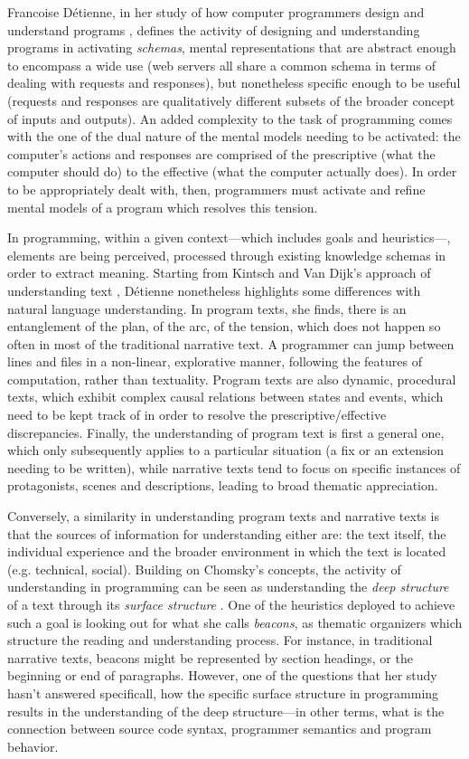 Francoise Détienne, in her study of how computer programmers design and understand programs \citep{detienne_software_2012}, defines the activity of designing and understanding programs in activating \emph{schemas}, mental representations that are abstract enough to encompass a wide use (web servers all share a common schema in terms of dealing with requests and responses), but nonetheless specific enough to be useful (requests and responses are qualitatively different subsets of the broader concept of inputs and outputs). An added complexity to the task of programming comes with the one of the dual nature of the mental models needing to be activated: the computer's actions and responses are comprised of the prescriptive (what the computer should do) to the effective (what the computer actually does). In order to be appropriately dealt with, then, programmers must activate and refine mental models of a program which resolves this tension.

In programming, within a given context—which includes goals and heuristics—, elements are being perceived, processed through existing knowledge schemas in order to extract meaning. Starting from Kintsch and Van Dijk's approach of understanding text \citep{kintsch_model_1978}, Détienne nonetheless highlights some differences with natural language understanding. In program texts, she finds, there is an entanglement of the plan, of the arc, of the tension, which does not happen so often in most of the traditional narrative text. A programmer can jump between lines and files in a non-linear, explorative manner, following the features of computation, rather than textuality. Program texts are also dynamic, procedural texts, which exhibit complex causal relations between states and events, which need to be kept track of in order to resolve the prescriptive/effective discrepancies. Finally, the understanding of program text is first a general one, which only subsequently applies to a particular situation (a fix or an extension needing to be written), while narrative texts tend to focus on specific instances of protagonists, scenes and descriptions, leading to broad thematic appreciation.

Conversely, a similarity in understanding program texts and narrative texts is that the sources of information for understanding either are: the text itself, the individual experience and the broader environment in which the text is located (e.g. technical, social). Building on Chomsky's concepts, the activity of understanding in programming can be seen as understanding the \emph{deep structure} of a text through its \emph{surface structure} \citep{chomsky_aspects_1965}. One of the heuristics deployed to achieve such a goal is looking out for what she calls \emph{beacons}, as thematic organizers which structure the reading and understanding process. For instance, in traditional narrative texts, beacons might be represented by section headings, or the beginning or end of paragraphs. However, one of the questions that her study hasn't answered specificall, how the specific surface structure in programming results in the understanding of the deep structure—in other terms, what is the connection between source code syntax, programmer semantics and program behavior.

